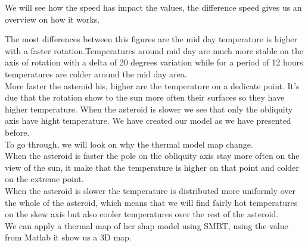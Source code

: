 We will see how the speed has impact the values, the difference speed gives us an overview on how it works.

The most differences between this figures are the mid day temperature is higher with a faster rotation.Temperatures around mid day are much more stable on the axis of rotation with a delta of 20 degrees variation while for a period of 12 hours temperatures are colder around the mid day area.\\[10pt]

More faster the asteroid his, higher are the temperature on a dedicate point. It's due that the rotation show to the sun more often their surfaces so they have higher temperature.
When the asteroid is slower we see that only the obliquity axis have hight temperature. We have created our model as we have presented before. \\[10pt]
To go through, we will look on why the thermal model map change.\\ [10pt]
When the asteroid is faster the pole on the obliquity axis stay more often on the view of the sun, it make that the temperature is higher on that point and colder on the extreme point.\\ [10pt]
When the asteroid is slower the temperature is distributed more uniformly over the whole of the asteroid, which means that we will find fairly hot temperatures on the skew axis but also cooler temperatures over the rest of the asteroid.\\[11pt]

We can apply a thermal map of her shap model using SMBT, using the value from Matlab it show us a 3D map.\\[10pt]

